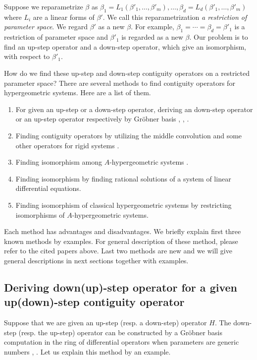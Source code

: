 \documentclass{article}
\begin{document}
Suppose we reparametrize $\beta$ as
$\beta_1=L_1(\beta'_1, \ldots, \beta'_m),
 \ldots,
 \beta_d=L_d(\beta'_1, \ldots, \beta'_m)
$
where $L_i$ are a linear forms of $\beta'$.
We call this reparametrization 
{\it a restriction of parameter space}\/.
We regard $\beta'$ as a new $\beta$.
For example,
$\beta_1=\cdots=\beta_d = \beta'_1$
is a restriction of parameter space
and $\beta'_1$ is regarded as a new $\beta$.
Our problem is to find an up-step operator
and a down-step operator, which give an isomorphism,
with respect to $\beta'_1$.

How do we find these up-step and down-step contiguity operators on a restricted parameter space?
There are several methods to find contiguity operators
for hypergeometric systems.
Here are a list of them.
\begin{enumerate}
\item For given an up-step or a down-step operator, deriving
an down-step operator or an up-step  operator respectively
by Gr\"obner basis  \cite{takayama-1989}, \cite{SST-ip}, \cite{nakayama-2024}.
\item Finding contiguity operators by utilizing the middle convolution
and some other operators for rigid systems \cite{oshima-2012}.
\item Finding isomorphism among $A$-hypergeometric systems \cite{saito-isom}.
\item Finding isomorphism by finding rational solutions of a system of
linear differential equations.
\item Finding isomorphism of classical hypergeometric systems by restricting isomorphisms of $A$-hypergeometric systems.
\end{enumerate}
Each method has advantages and disadvantages.
We briefly explain first three known methods by examples.
For general description of these method, please refer to the cited papers above.
Last two methods are new and we will give general 
descriptions in next sections together with examples.

\subsection{Deriving down(up)-step operator for a given up(down)-step contiguity operator }
\label{sec:find_contiguity_by_sygyzy}

Suppose that we are given an up-step (resp. a down-step) operator $H$.
The down-step (resp. the up-step) operator can be constructed by a Gr\"obner basis computation in the ring of differential operators 
when parameters are generic numbers \cite{takayama-1989}, \cite{nakayama-2024}.
Let us explain this method by an example.
\end{document}
